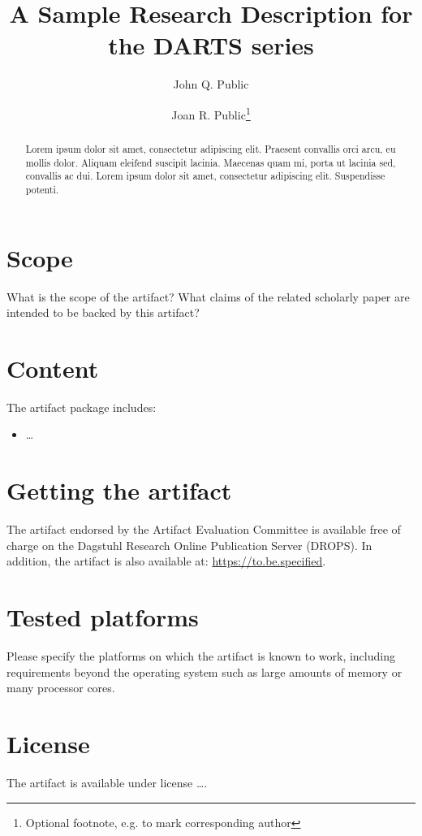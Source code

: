 \documentclass[a4paper,UKenglish]{darts-v2019}
\title{A Sample Research Description for the DARTS series} %
\author{John Q. Public}{Dummy University Computing Laboratory, [optional: Address], Country \and My second affiliation, Country \and \url{http://www.myhomepage.edu} }{johnqpublic@dummyuni.org}{https://orcid.org/0000-0002-1825-0097}{(Optional) author-specific funding acknowledgements}%
\author{Joan R. Public\footnote{Optional footnote, e.g. to mark corresponding author}}{Department of Informatics, Dummy College, [optional: Address], Country}{joanrpublic@dummycollege.org}{[orcid]}{[funding]}
\newenvironment{scope}{\section{Scope}}{}
\newenvironment{content}{\section{Content}}{}
\newenvironment{getting}{\section{Getting the artifact} The artifact 
endorsed by the Artifact Evaluation Committee is available free of 
charge on the Dagstuhl Research Online Publication Server (DROPS).}{}
\newenvironment{platforms}{\section{Tested platforms}}{}
\newcommand{\license}[1]{{\section{License}#1}}
\begin{document}
\maketitle

\begin{abstract}
Lorem ipsum dolor sit amet, consectetur adipiscing elit. Praesent convallis orci arcu, eu mollis dolor. Aliquam eleifend suscipit lacinia. Maecenas quam mi, porta ut lacinia sed, convallis ac dui. Lorem ipsum dolor sit amet, consectetur adipiscing elit. Suspendisse potenti. 
 \end{abstract}


\begin{scope}
What is the scope of the artifact? What claims of the related scholarly paper are intended to be backed by this artifact?
\end{scope}

\begin{content}
The artifact package includes:
\begin{itemize}
\item \dots
\end{itemize}
\end{content}

\begin{getting}
In addition, the artifact is also available at:
\url{https://to.be.specified}.
\end{getting}

\begin{platforms}
Please specify the platforms on which the artifact is known to
work, including requirements beyond the operating system such as large
amounts of memory or many processor cores.
\end{platforms}

\license{The artifact is available under license \dots.}
\end{document}

